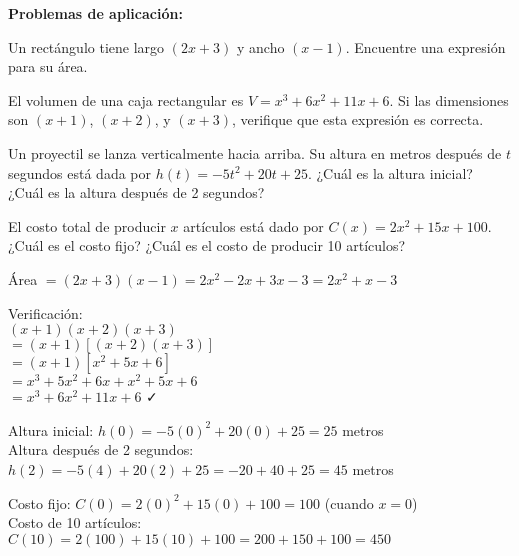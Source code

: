 \begin{exercise}
\problem \textbf{Problemas de aplicación:}

\begin{exerciselist}
    \item Un rectángulo tiene largo $(2x + 3)$ y ancho $(x - 1)$. Encuentre una expresión para su área.
    
    \item El volumen de una caja rectangular es $V = x^3 + 6x^2 + 11x + 6$. Si las dimensiones son $(x + 1)$, $(x + 2)$, y $(x + 3)$, verifique que esta expresión es correcta.
    
    \item Un proyectil se lanza verticalmente hacia arriba. Su altura en metros después de $t$ segundos está dada por $h(t) = -5t^2 + 20t + 25$. ¿Cuál es la altura inicial? ¿Cuál es la altura después de 2 segundos?
    
    \item El costo total de producir $x$ artículos está dado por $C(x) = 2x^2 + 15x + 100$. ¿Cuál es el costo fijo? ¿Cuál es el costo de producir 10 artículos?
\end{exerciselist}

\begin{solucion}
\begin{exerciselist}
    \item Área $= (2x + 3)(x - 1) = 2x^2 - 2x + 3x - 3 = 2x^2 + x - 3$
    
    \item Verificación:\\
    $(x + 1)(x + 2)(x + 3)$\\
    $= (x + 1)[(x + 2)(x + 3)]$\\
    $= (x + 1)[x^2 + 5x + 6]$\\
    $= x^3 + 5x^2 + 6x + x^2 + 5x + 6$\\
    $= x^3 + 6x^2 + 11x + 6$ ✓
    
    \item Altura inicial: $h(0) = -5(0)^2 + 20(0) + 25 = 25$ metros\\
    Altura después de 2 segundos: $h(2) = -5(4) + 20(2) + 25 = -20 + 40 + 25 = 45$ metros
    
    \item Costo fijo: $C(0) = 2(0)^2 + 15(0) + 100 = 100$ (cuando $x = 0$)\\
    Costo de 10 artículos: $C(10) = 2(100) + 15(10) + 100 = 200 + 150 + 100 = 450$
\end{exerciselist}
\end{solucion}
\end{exercise}